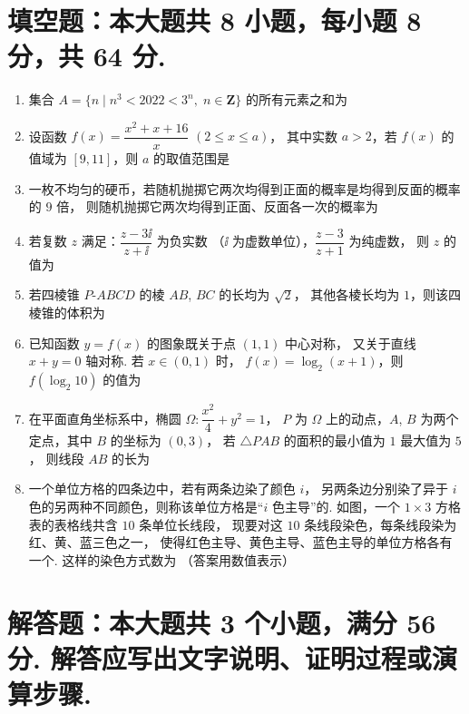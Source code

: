 \documentclass{chsmc}
\begin{document}
\section{填空题：本大题共 8 小题，每小题 8 分，共 64 分.}

\begin{enumerate}
  \item 集合 $A = \{n \mid n^3 < 2022 < 3^n,\; n \in \mathbf{Z}\}$
    的所有元素之和为 \blankline
  \item 设函数 $f(x) = \dfrac{x^2 + x + 16}{x}$ $(2 \leqslant x \leqslant a)$，
    其中实数 $a > 2$，若 $f(x)$ 的值域为 $[9,11]$，则 $a$ 的取值范围是 \blankline
  \item 一枚不均匀的硬币，若随机抛掷它两次均得到正面的概率是均得到反面的概率的 $9$ 倍，
    则随机抛掷它两次均得到正面、反面各一次的概率为 \blankline
  \item 若复数 $z$ 满足：$\dfrac{z - 3\ii}{z + \ii}$ 为负实数
    （$\ii$ 为虚数单位），$\dfrac{z - 3}{z + 1}$ 为纯虚数，
    则 $z$ 的值为 \blankline
  \item 若四棱锥 $P$-$ABCD$ 的棱 $AB$, $BC$ 的长均为 $\sqrt{2}$，
    其他各棱长均为 $1$，则该四棱锥的体积为 \blankline
  \item 已知函数 $y = f(x)$ 的图象既关于点 $(1,1)$ 中心对称，
    又关于直线 $x + y = 0$ 轴对称. 若 $x \in (0,1)$ 时，
    $f(x) = \log_2(x+1)$，则 $f(\log_2 10)$ 的值为 \blankline
  \item 在平面直角坐标系中，椭圆 $\Omega\colon \dfrac{x^2}{4} + y^2 = 1$，
    $P$ 为 $\Omega$ 上的动点，$A$, $B$ 为两个定点，其中 $B$ 的坐标为 $(0,3)$，
    若 $\triangle PAB$ 的面积的最小值为 $1$ 最大值为 $5$，
    则线段 $AB$ 的长为 \blankline
  \item 一个单位方格的四条边中，若有两条边染了颜色 $i$，
    另两条边分别染了异于 $i$ 色的另两种不同颜色，则称该单位方格是“$i$ 色主导”的.
    如图，一个 $1 \times 3$ 方格表的表格线共含 $10$ 条单位长线段，
    现要对这 $10$ 条线段染色，每条线段染为红、黄、蓝三色之一，
    使得红色主导、黄色主导、蓝色主导的单位方格各有一个.
    这样的染色方式数为 \blankline （答案用数值表示）
\end{enumerate}

\section{解答题：本大题共 3 个小题，满分 56 分. 解答应写出文字说明、证明过程或演算步骤.}
\end{document}
